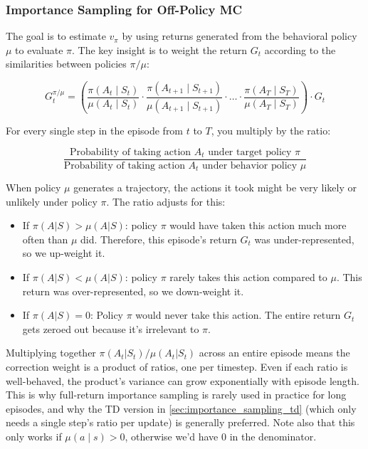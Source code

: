 \subsubsection{Importance Sampling for Off-Policy MC}
The goal is to estimate $v_\pi$ by using returns generated from the behavioral policy $\mu$ to evaluate $\pi$. The key insight is to weight the return $G_t$ according to the similarities between policies $\pi/\mu$:

\[
    G_t^{\pi/\mu} = \left( \frac{\pi(A_t \mid S_t)}{\mu(A_t \mid S_t)} \cdot \frac{\pi(A_{t+1} \mid S_{t+1})}{\mu(A_{t+1} \mid S_{t+1})} \cdot \dots \cdot \frac{\pi(A_T \mid S_T)}{\mu(A_T \mid S_T)} \right) \cdot G_t
\]

For every single step in the episode from $t$ to $T$, you multiply by the ratio:

$$\frac{\text{Probability of taking action } A_t \text{ under target policy } \pi}{\text{Probability of taking action } A_t \text{ under behavior policy } \mu}$$

When policy $\mu$ generates a trajectory, the actions it took might be very likely or unlikely under policy $\pi$. The ratio adjusts for this:

\begin{itemize}
    \item If $\pi(A\vert{}S) > \mu(A\vert{}S)$: policy $\pi$ would have taken this action much more often than $\mu$ did. Therefore, this episode's return $G_t$ was under-represented, so we up-weight it.
    \item If $\pi(A\vert{}S) < \mu(A\vert{}S)$: policy $\pi$ rarely takes this action compared to $\mu$. This return was over-represented, so we down-weight it.
    \item If $\pi(A\vert{}S) = 0$: Policy $\pi$ would never take this action. The entire return $G_t$ gets zeroed out because it's irrelevant to $\pi$.
\end{itemize}

Multiplying together $\pi(A_t|S_t)/\mu(A_t|S_t)$ across an entire episode means the correction weight is a product of ratios, one per timestep. Even if each ratio is well-behaved, the product's variance can grow exponentially with episode length. This is why full-return importance sampling is rarely used in practice for long episodes, and why the TD version in \ref{sec:importance_sampling_td} (which only needs a single step's ratio per update) is generally preferred. Note also that this only works if $\mu(a \mid s) > 0 $, otherwise we'd have $0$ in the denominator.

